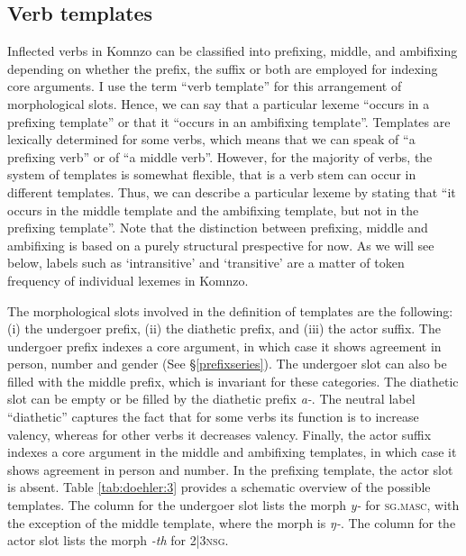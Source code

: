 \documentclass[output=paper]{langscibook}
\begin{document}
\subsection{Verb templates}\label{verbtemp}
Inflected verbs in Komnzo can be classified into prefixing, middle, and ambifixing depending on whether the prefix, the suffix or both are employed for indexing core arguments. I use the term ``verb template'' for this arrangement of morphological slots. Hence, we can say that a particular lexeme ``occurs in a prefixing template'' or that it ``occurs in an ambifixing template''. Templates are lexically determined for some verbs, which means that we can speak of ``a prefixing verb'' or of ``a middle verb''. However, for the majority of verbs, the system of templates is somewhat flexible, that is a verb stem can occur in different templates. Thus, we can describe a particular lexeme by stating that ``it occurs in the middle template and the ambifixing template, but not in the prefixing template''. Note that the distinction between prefixing, middle and ambifixing is based on a purely structural prespective for now. As we will see below, labels such as `intransitive' and `transitive' are a matter of token frequency of individual lexemes in Komnzo.

The morphological slots involved in the definition of templates are the following: (i) the undergoer prefix, (ii) the diathetic prefix, and (iii) the actor suffix. The undergoer prefix indexes a core argument, in which case it shows agreement in person, number and gender (See \S\ref{prefixseries}). The undergoer slot can also be filled with the middle prefix, which is invariant for these categories. The diathetic slot can be empty or be filled by the diathetic prefix \emph{a-}. The neutral label ``diathetic'' captures the fact that for some verbs its function is to increase valency, whereas for other verbs it decreases valency. Finally, the actor suffix indexes a core argument in the middle and ambifixing templates, in which case it shows agreement in person and number. In the prefixing template, the actor slot is absent. Table \ref{tab:doehler:3} provides a schematic overview of the possible templates. The column for the undergoer slot lists the morph \emph{y-} for \textsc{sg}.\textsc{masc}, with the exception of the middle template, where the morph is \emph{ŋ-}. The column for the actor slot lists the morph \emph{-th} for 2|3\textsc{nsg}.
\end{document}

